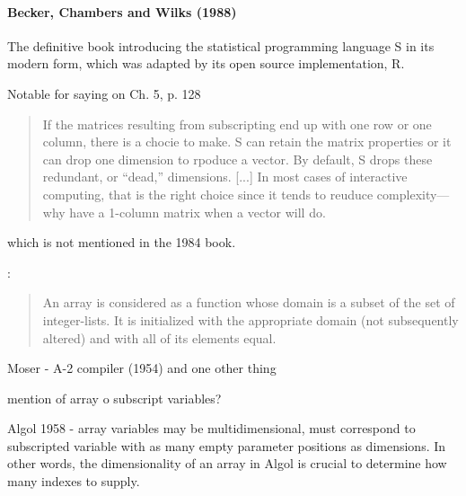 \paragraph{Becker, Chambers and Wilks (1988)~\cite{Becker1988}}

The definitive book introducing the statistical programming language S in its
modern form, which was adapted by its open source implementation, R.

Notable for saying on Ch. 5, p. 128

\begin{quote}
If the matrices resulting from subscripting end up with one row or one
column, there is a chocie to make. S can retain the matrix properties or it can
drop one dimension to rpoduce a vector. By default, S drops these redundant,
or ``dead,'' dimensions. [...]
In most cases of interactive computing, that is the right choice since it tends to
reuduce complexity---why have a 1-column matrix when a vector will do.
\end{quote}

which is not mentioned in the 1984 book.







\cite{Landin1965}:
\begin{quote}
An array is considered as a function whose domain is a subset of the set of integer-lists.
It is initialized with the appropriate domain (not subsequently altered) and with all of its elements equal.
\end{quote}


Moser - A-2 compiler (1954) and one other thing

mention of array o subscript variables?


Algol 1958 - array variables may be multidimensional, must correspond to subscripted variable with as many empty parameter positions as dimensions.
In other words, the dimensionality of an array in Algol is crucial to determine how many indexes to supply.

